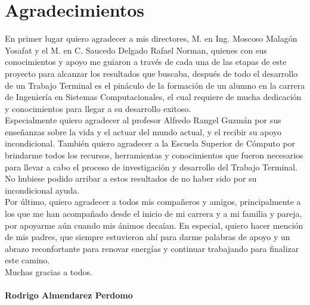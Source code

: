 \documentclass[11pt]{report}
\begin{document}
\newpage
\section*{Agradecimientos}
\vfill
En primer lugar quiero agradecer a mis directores, M. en Ing. Moscoso Malagón Yosafat y el M. en C. Saucedo Delgado Rafael Norman, quienes con sus conocimientos y apoyo me guiaron a través de cada una de las etapas de este proyecto para alcanzar los resultados que buscaba, después de todo el  desarrollo de un Trabajo Terminal es el pináculo de  la formación de un alumno en la carrera de Ingeniería en Sistemas Computacionales, el cual requiere de mucha dedicación y conocimientos para llegar a su desarrollo exitoso.
\\
\newline
Especialmente quiero agradecer al profesor Alfredo Rangel Guzmán por sus enseñanzas sobre la vida y el actuar del mundo actual, y el recibir su apoyo incondicional.
También quiero agradecer a la Escuela Superior de Cómputo por brindarme todos los recursos, herramientas y conocimientos que fueron necesarios para llevar a cabo el proceso de investigación y desarrollo del Trabajo Terminal. No hubiese podido arribar a estos resultados de no haber sido por su incondicional ayuda.
\\
\newline
Por último, quiero agradecer a todos mis compañeros y amigos, principalmente a los que me han acompañado desde el inicio de mi carrera y a mi familia y pareja, por apoyarme aún cuando mis ánimos decaían. En especial, quiero hacer mención de mis padres, que siempre estuvieron ahí para darme palabras de apoyo y un abrazo reconfortante para renovar energías y continuar trabajando para finalizar este camino.
\\
\newline
Muchas gracias a todos.
\\
\paragraph{Rodrigo Almendarez Perdomo}
\vfill

\tableofcontents


\end{document}
